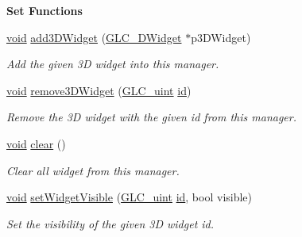 \begin{Indent}{\bf Set Functions}\par
\begin{DoxyCompactItemize}
\item 
\hyperlink{group___u_a_v_objects_plugin_ga444cf2ff3f0ecbe028adce838d373f5c}{void} \hyperlink{class_g_l_c__3_d_widget_manager_afecee77cbca6962c498fe93c5cd14e52}{add3\-D\-Widget} (\hyperlink{class_g_l_c__3_d_widget}{G\-L\-C\-\_\-D\-Widget} $\ast$p3\-D\-Widget)
\begin{DoxyCompactList}\small\item\em Add the given 3\-D widget into this manager. \end{DoxyCompactList}\item 
\hyperlink{group___u_a_v_objects_plugin_ga444cf2ff3f0ecbe028adce838d373f5c}{void} \hyperlink{class_g_l_c__3_d_widget_manager_aec963fe44ffc5e7973681345c45d6f55}{remove3\-D\-Widget} (\hyperlink{glc__global_8h_abf950976fabed69026558df8e2da6c6b}{G\-L\-C\-\_\-uint} \hyperlink{glext_8h_a58c2a664503e14ffb8f21012aabff3e9}{id})
\begin{DoxyCompactList}\small\item\em Remove the 3\-D widget with the given id from this manager. \end{DoxyCompactList}\item 
\hyperlink{group___u_a_v_objects_plugin_ga444cf2ff3f0ecbe028adce838d373f5c}{void} \hyperlink{class_g_l_c__3_d_widget_manager_a4d5356606d9de418cacbb79ece2df4e5}{clear} ()
\begin{DoxyCompactList}\small\item\em Clear all widget from this manager. \end{DoxyCompactList}\item 
\hyperlink{group___u_a_v_objects_plugin_ga444cf2ff3f0ecbe028adce838d373f5c}{void} \hyperlink{class_g_l_c__3_d_widget_manager_abf21fbb87192aa91d6b041abc65ca446}{set\-Widget\-Visible} (\hyperlink{glc__global_8h_abf950976fabed69026558df8e2da6c6b}{G\-L\-C\-\_\-uint} \hyperlink{glext_8h_a58c2a664503e14ffb8f21012aabff3e9}{id}, bool visible)
\begin{DoxyCompactList}\small\item\em Set the visibility of the given 3\-D widget id. \end{DoxyCompactList}\end{DoxyCompactItemize}
\end{Indent}
